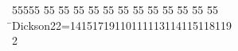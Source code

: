 %
%
\begin{tabbing}
55555 \= 55 \= 55 \= 55 \= 55 \= 55 \= 55 \= 55 \= 55 \= 55 \= 55 \= 55 \= 55 \= \>Dickson22=14151719110111113114115118119\\[0pt]
2\>\end{tabbing}
